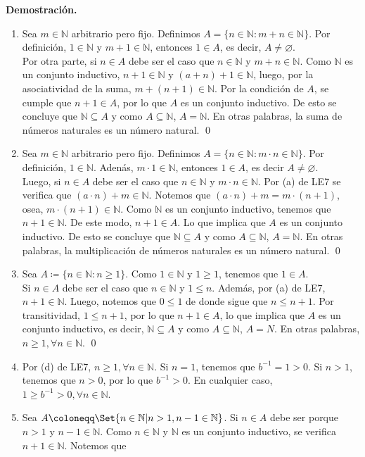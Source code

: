 \documentclass[11pt]{article}
\newcommand{\N}{\mathbb{N}}
\let\emptyset\varnothing
\let\set\Set
\begin{document}
\textbf{Demostración.}

\begin{enumerate}[label=\alph*)]
    \item Sea $m\in \N$ arbitrario pero fijo. Definimos $A=\{ n\in \N : m+n \in \N \}$. Por definición, $1\in \N$ y $m+1\in \N$, entonces $1\in A$, es decir, $A\neq \emptyset$. \\[5pt] Por otra parte, si $n\in A$ debe ser el caso que $n\in \N$ y $m+n\in \N$. Como $\N$ es un conjunto inductivo, $n+1 \in \N$ y $(a+n)+1 \in \N$, luego, por la asociatividad de la suma, $m+(n+1)\in \N$. Por la condición de $A$, se cumple que $n+1\in A$, por lo que $A$ es un conjunto inductivo. De esto se concluye que $\N\subseteq A$ y como $A\subseteq \N$, $A=\N$. En otras palabras, la suma de números naturales es un número natural. \qed
    \item Sea $m\in \N$ arbitrario pero fijo. Definimos $A=\{n\in \N: m\cdot n \in \N\}$. Por definición, $1 \in \N$. Adenás, $m\cdot 1 \in \N$, entonces $1 \in A$, es decir $A \neq \emptyset$.\\[5pt] 
    Luego, si $n \in A$ debe ser el caso que $n\in \N$ y $m \cdot n \in \N$. Por (a) de LE7 se verifica que $(a \cdot n) + m \in \N$. Notemos que $(a \cdot n) + m=m \cdot (n+1)$, osea, $m \cdot (n+1) \in \N$. Como $\N$ es un conjunto inductivo, tenemos que $n+1\in \N$. De este modo, $n+1\in A$. Lo que implica que $A$ es un conjunto inductivo. De esto se concluye que $\N \subseteq A$ y como $A\subseteq \N$, $A=\N$. En otras palabras, la multiplicación de números naturales es un número natural. \qed
    \item Sea $A\coloneqq \{n\in \N: n\geq 1\}$. Como $1\in \N$ y $1\geq 1$, tenemos que $1\in A$.\\[5pt]
    Si $n\in A$ debe ser el caso que $n\in \N$ y $1\leq n$. Además, por (a) de LE7, $n+1\in \N$. Luego, notemos que $0 \leq 1$ de donde sigue que $n \leq n+1$. Por transitividad, $1\leq n+1$, por lo que $n+1\in A$, lo que implica que $A$ es un conjunto inductivo, es decir, $\N\subseteq A$ y como $A\subseteq \N$, $A=N$. En otras palabras, $n\geq 1, \forall n\in\N$. \qed
    \item Por (d) de LE7, $n\geq 1, \forall n\in \N$. Si $n=1$, tenemos que $b^{-1}=1>0$. Si $n>1$, tenemos que $n>0$, por lo que $b^{-1}>0$. En cualquier caso, $1\geq b^{-1}>0, \forall n\in \N$.
    \item Sea $A \coloneqq \set{n\in \N | n>1, n-1\in \N}$. Si $n\in A$ debe ser porque $n>1$ y $n-1\in \N$. Como $n\in \N$ y $\N$ es un conjunto inductivo, se verifica $n+1\in\N$. Notemos que \begin{align*}

\end{align*}
\end{enumerate}
\end{document}
